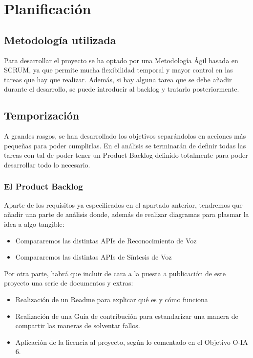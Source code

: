 \chapter{Planificación}

\noindent{}

\section{Metodología utilizada}
Para desarrollar el proyecto se ha optado por una Metodología Ágil basada en SCRUM, ya que permite mucha flexibilidad temporal y mayor control en las tareas que hay que realizar. Además, si hay alguna tarea que se debe añadir durante el desarrollo, se puede introducir al backlog y tratarlo posteriormente.

\section{Temporización}
A grandes rasgos, se han desarrollado los objetivos separándolos en acciones más pequeñas para poder cumplirlas. En el análisis se terminarán de definir todas las tareas con tal de poder tener un Product Backlog definido totalmente para poder desarrollar todo lo necesario.

\subsection{El Product Backlog}

Aparte de los requisitos ya especificados en el apartado anterior, tendremos que añadir una parte de análisis donde, además de realizar diagramas para plasmar la idea a algo tangible:

\begin{itemize}
	\item Compararemos las distintas APIs de Reconocimiento de Voz
	\item Compararemos las distintas APIs de Síntesis de Voz
\end{itemize}

Por otra parte, habrá que incluir de cara a la puesta a publicación de este proyecto una serie de documentos y extras:

\begin{itemize}
	\item Realización de un Readme para explicar qué es y cómo funciona
	\item Realización de una Guía de contribución para estandarizar una manera de compartir las maneras de solventar fallos.
	\item Aplicación de la licencia al proyecto, según lo comentado en el Objetivo O-IA 6.
\end{itemize}

